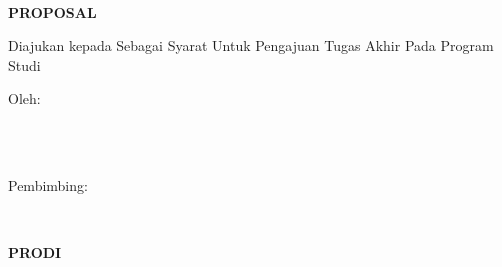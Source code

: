 
\newpage
{}
\begin{center}
    \begin{doublespace}
        \textbf{\large{\MakeUppercase{\judulid}}}\\[2.5cm]
    \end{doublespace}

    \textbf{\MakeUppercase{\large{Proposal \tipe}}}\\[0.5cm]
    \begin{onehalfspace}
        Diajukan kepada {\fakultas} {\universitas} Sebagai Syarat Untuk Pengajuan Tugas Akhir Pada Program Studi \prodi\\[1.8cm]
    \end{onehalfspace}

    \large Oleh: \\
    \begin{onehalfspace}
        \large{\penulis} \\
        \large{\nim}\\[1.5cm]
    \end{onehalfspace}
    \vspace{1.5cm}

    \large Pembimbing: \\
    \begin{onehalfspace}
        \large{\pembimbing} \\
    \end{onehalfspace}

    \vfill

    \textbf{\large \MakeUppercase{Prodi \gelar \prodi}}\\
    \textbf{\large \MakeUppercase{\fakultas}}\\
    \textbf{\large \MakeUppercase{\universitas}}\\
    \textbf{\large \the\year{}}\\
\end{center}
